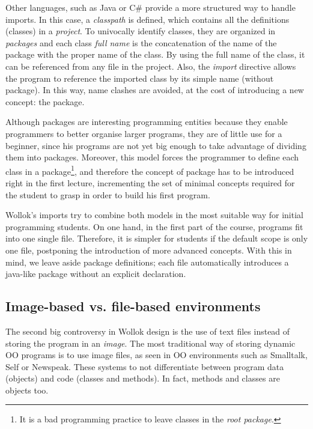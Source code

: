 Other languages, such as Java or C\# provide a more structured way to handle imports. 
In this case, a \emph{classpath} is defined, which contains all the definitions (\ie classes) in a \emph{project}.
To univocally identify classes, they are organized in \emph{packages} and each class \emph{full name} is the concatenation of the name of the package with the proper name of the class.
By using the full name of the class, it can be referenced from any file in the project.
Also, the \emph{import} directive allows the program to reference the imported class by its simple name (without package).
In this way, name clashes are avoided, at the cost of introducing a new concept: the package.

Although packages are interesting programming entities because they enable programmers to better organise larger programs, 
they are of little use for a beginner, since his programs are not yet big enough to take advantage of dividing them into packages.
Moreover, this model forces the programmer to define each class in a package\footnote{It is a bad programming practice to leave classes in the \emph{root package}.}, 
and therefore the concept of package has to be introduced right in the first lecture, 
incrementing the set of minimal concepts required for the student to grasp in order to build his first program.

\medskip

Wollok's imports try to combine both models in the most suitable way for initial programming students.
On one hand, in the first part of the course, programs fit into one single file. 
Therefore, it is simpler for students if the default scope is only one file, postponing the introduction of more advanced concepts.
With this in mind, we leave aside package definitions; each file automatically introduces a java-like package without an explicit declaration.


\subsection{Image-based vs. file-based environments}
The second big controversy in Wollok design is the use of text files instead of storing the program in an \emph{image}.
The most traditional way of storing dynamic OO programs is to use image files, as seen in OO environments such as Smalltalk, Self or Newspeak.
These systems to not differentiate between program data (objects) and code (classes and methods). 
In fact, methods and classes are objects too.

